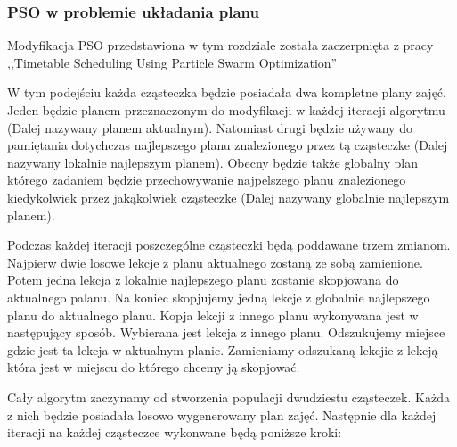 \subsubsection{PSO w problemie układania planu}
\par Modyfikacja PSO przedstawiona w tym rozdziale została zaczerpnięta z pracy ,,Timetable Scheduling Using Particle Swarm Optimization'' \cite{pso}
\par W tym podejściu każda cząsteczka będzie posiadała dwa kompletne plany zajęć. Jeden będzie planem przeznaczonym do modyfikacji w każdej iteracji algorytmu (Dalej nazywany planem aktualnym). Natomiast drugi będzie używany do pamiętania dotychczas najlepszego planu znalezionego przez tą cząsteczke (Dalej nazywany lokalnie najlepszym planem). Obecny będzie także globalny plan którego zadaniem będzie przechowywanie najpelszego planu znalezionego kiedykolwiek przez jakąkolwiek cząsteczke (Dalej nazywany globalnie najlepszym planem).  
\par Podczas każdej iteracji poszczególne cząsteczki będą poddawane trzem zmianom. Najpierw dwie losowe lekcje z planu aktualnego zostaną ze sobą zamienione. Potem jedna lekcja z lokalnie najlepszego planu zostanie skopjowana do aktualnego palanu. Na koniec skopjujemy jedną lekcje z globalnie najlepszego planu do aktualnego planu. Kopja lekcji z innego planu wykonywana jest w następujący sposób. Wybierana jest lekcja z innego planu. Odszukujemy miejsce gdzie jest ta lekcja w aktualnym planie. Zamieniamy odszukaną lekcjie z lekcją która jest w miejscu do którego chcemy ją skopjować. 
\par Cały algorytm zaczynamy od stworzenia populacji dwudziestu cząsteczek. Każda z nich będzie posiadała losowo wygenerowany plan zajęć. Następnie dla każdej iteracji na każdej cząsteczce wykonwane będą poniższe kroki:
